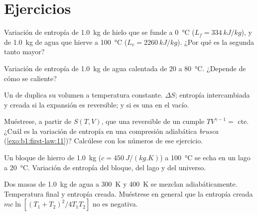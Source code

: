 \section{Ejercicios}

\begin{exercise}[$\star$]\label{exo:b1:second-law-entropy:1}
Variación de entropía de \qty{1.0}{kg} de hielo que se funde a
\qty{0}{\degreeCelsius} ($L_f = \qty{334}{kJ/kg}$), y de \qty{1.0}{kg} de
agua que hierve a \qty{100}{\degreeCelsius} ($L_v = \qty{2260}{kJ/kg}$).
¿Por qué es la segunda tanto mayor?
\end{exercise}

\begin{exercise}[$\star$]\label{exo:b1:second-law-entropy:2}
Variación de entropía de \qty{1.0}{kg} de agua calentada de \qty{20}{} a
\qty{80}{\degreeCelsius}. ¿Depende de cómo se caliente?
\end{exercise}

\begin{exercise}[$\star$]\label{exo:b1:second-law-entropy:3}
Un  de  duplica su volumen a temperatura constante.
$\Delta S$; entropía intercambiada y creada si la expansión es reversible;
y si es una  en el vacío.
\end{exercise}

\begin{exercise}[$\star$]\label{exo:b1:second-law-entropy:4}
Muéstrese, a partir de $S(T, V)$, que una 
reversible de un  cumple $TV^{\gamma - 1} = $ cte. ¿Cuál es la
variación de entropía en una compresión adiabática \emph{brusca}
(\cref{exo:b1:first-law:11})? Calcúlese con los números de ese ejercicio.
\end{exercise}

\begin{exercise}[$\star\star$]\label{exo:b1:second-law-entropy:5}
Un bloque de hierro de \qty{1.0}{kg} ($c = \qty{450}{J/(kg.K)}$) a \qty{100}{\degreeCelsius}
se echa en un lago a \qty{20}{\degreeCelsius}. Variación de entropía del
bloque, del lago y del universo.
\end{exercise}

\begin{exercise}[$\star\star$]\label{exo:b1:second-law-entropy:6}
Dos masas de \qty{1.0}{kg} de agua a \qty{300}{K} y \qty{400}{K} se mezclan
adiabáticamente. Temperatura final y entropía creada. Muéstrese en general
que la entropía creada $mc\ln[(T_1 + T_2)^2/4T_1T_2]$ no es negativa.
\end{exercise}


